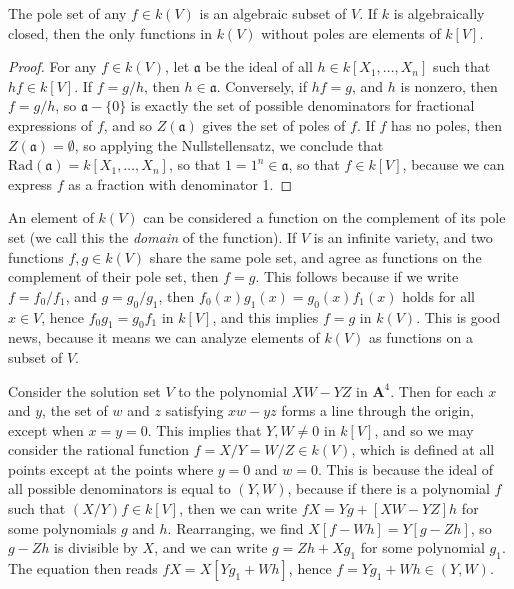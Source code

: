 \begin{prop}
    The pole set of any $f \in k(V)$ is an algebraic subset of $V$. If $k$ is algebraically closed, then the only functions in $k(V)$ without poles are elements of $k[V]$.
\end{prop}
\begin{proof}
    For any $f \in k(V)$, let $\mathfrak{a}$ be the ideal of all $h \in k[X_1, \dots, X_n]$ such that $hf \in k[V]$. If $f = g/h$, then $h \in \mathfrak{a}$. Conversely, if $hf = g$, and $h$ is nonzero, then $f = g/h$, so $\mathfrak{a} - \{ 0 \}$ is exactly the set of possible denominators for fractional expressions of $f$, and so $Z(\mathfrak{a})$ gives the set of poles of $f$. If $f$ has no poles, then $Z(\mathfrak{a}) = \emptyset$, so applying the Nullstellensatz, we conclude that $\text{Rad}(\mathfrak{a}) = k[X_1, \dots, X_n]$, so that $1 = 1^n \in \mathfrak{a}$, so that $f \in k[V]$, because we can express $f$ as a fraction with denominator 1.
\end{proof}

An element of $k(V)$ can be considered a function on the complement of its pole set (we call this the \emph{domain} of the function). If $V$ is an infinite variety, and two functions $f,g \in k(V)$ share the same pole set, and agree as functions on the complement of their pole set, then $f = g$. This follows because if we write $f = f_0/f_1$, and $g = g_0/g_1$, then $f_0(x) g_1(x) = g_0(x) f_1(x)$ holds for all $x \in V$, hence $f_0g_1 = g_0f_1$ in $k[V]$, and this implies $f = g$ in $k(V)$. This is good news, because it means we can analyze elements of $k(V)$ as functions on a subset of $V$.

\begin{example}
    Consider the solution set $V$ to the polynomial $XW - YZ$ in $\mathbf{A}^4$. Then for each $x$ and $y$, the set of $w$ and $z$ satisfying $xw - yz$ forms a line through the origin, except when $x = y = 0$. This implies that $Y,W \neq 0$ in $k[V]$, and so we may consider the rational function $f = X/Y = W/Z \in k(V)$, which is defined at all points except at the points where $y = 0$ and $w = 0$. This is because the ideal of all possible denominators is equal to $(Y,W)$, because if there is a polynomial $f$ such that $(X/Y)f \in k[V]$, then we can write $fX = Yg + [XW - YZ]h$ for some polynomials $g$ and $h$. Rearranging, we find $X[f - Wh] = Y[g-Zh]$, so $g - Zh$ is divisible by $X$, and we can write $g = Zh + Xg_1$ for some polynomial $g_1$. The equation then reads $fX = X[Yg_1 + Wh]$, hence $f = Yg_1 + Wh \in (Y,W)$.
\end{example}

